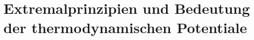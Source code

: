 
\chapter{Extremalprinzipien und Bedeutung der thermodynamischen Potentiale\label{sec:Extremalprinzipien und Bedeutung der thermodynamischen Potentiale}}

